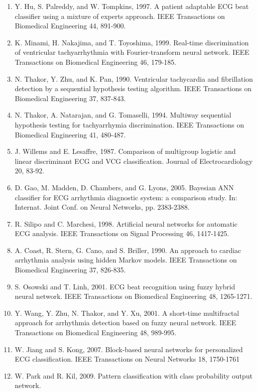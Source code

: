\documentclass[times,twocolumn,final,authoryear]{elsarticle}
\begin{document}
\begin{enumerate}
\item Y. Hu, S. Palreddy, and W. Tompkins, 1997. A patient adaptable ECG beat classifier using a mixture of experts approach.
     IEEE Transactions on Biomedical Engineering 44, 891-900.
\item K. Minami, H. Nakajima, and T. Toyoshima, 1999. Real-time discrimination of ventricular tachyarrhythmia with Fourier-transform neural network.
     IEEE Transactions on Biomedical Engineering 46, 179-185.
\item N. Thakor, Y. Zhu, and K. Pan, 1990. Ventricular tachycardia and fibrillation detection by a sequential hypothesis testing algorithm.
     IEEE Transactions on Biomedical Engineering 37, 837-843.
\item N. Thakor, A. Natarajan, and G. Tomaselli, 1994. Multiway sequential hypothesis testing for tachyarrhymia discrimination.
     IEEE Transactions on Biomedical Engineering 41, 480-487.
\item J. Willems and E. Lesaffre, 1987. Comparison of multigroup logistic and linear discriminant ECG and VCG classification.
     Journal of Electrocardiology 20, 83-92.
\item D. Gao, M. Madden, D. Chambers, and G. Lyons, 2005. Bayesian ANN classifier for ECG arrhythmia diagnostic system: a comparison study.
     In: Internat. Joint Conf. on Neural Networks, pp. 2383-2388.
\item R. Silipo and C. Marchesi, 1998. Artificial neural networks for automatic ECG analysis.
     IEEE Transactions on Signal Processing 46, 1417-1425.
\item A. Coast, R. Stern, G. Cano, and S. Briller, 1990. An approach to cardiac arrhythmia analysis using hidden Markov models.
     IEEE Transactions on Biomedical Engineering 37, 826-835.
\item S. Osowski and T. Linh, 2001. ECG beat recognition using fuzzy hybrid neural network.
     IEEE Transactions on Biomedical Engineering 48, 1265-1271.
\item Y. Wang, Y. Zhu, N. Thakor, and Y. Xu, 2001. A short-time multifractal approach for arrhythmia detection based on fuzzy neural network.
     IEEE Transactions on Biomedical Engineering 48, 989-995.
\item W. Jiang and S. Kong, 2007. Block-based neural networks for personalized ECG classification.
     IEEE Transactions on Neural Networks 18, 1750-1761
\item W. Park and R. Kil, 2009. Pattern classification with class probability output network.

\end{enumerate}
\end{document}
